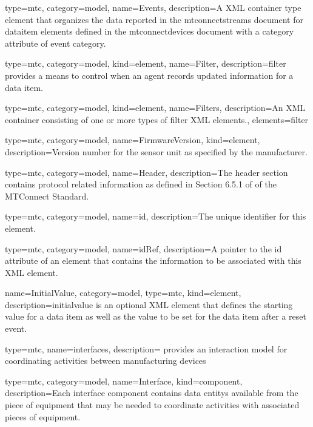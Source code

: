 {
  type=mtc,
  category=model,
  name={Events},
  description={A XML container type element that organizes the data reported in the \glspl{mtconnectstream} document for \gls{dataitem} elements defined in the \glspl{mtconnectdevice} document with a \gls{category} attribute of \gls{event category}.}
}


{
  type=mtc,
  category=model,
  kind={element},
  name={Filter},
  description={\gls{filter} provides a means to control when an \gls{agent} records updated information for a data item.}
}

{
  type=mtc,
  category=model,
  kind={element},
  name={Filters},
  description={An XML container consisting of one or more types of \gls{filter} XML elements.},
  elements={\gls{filter}}
}


{
  type=mtc,
  category=model,
  name={FirmwareVersion},
  kind={element},
  description={Version number for the sensor unit as specified by the manufacturer.}
}


{
  type=mtc,
  category=model,
  name={Header},
  description={The \gls{header} section contains protocol related information as defined in Section 6.5.1 of  of the MTConnect Standard.}
}


{
  type=mtc,
  category=model,
  name={id},
  description={The unique identifier for this element.}
}


{
  type=mtc,
  category=model,
  name={idRef},
  description={A pointer to the \gls{id} attribute of an element that contains the information to be associated with this XML element.}
}


{
  name={InitialValue},
  category=model,
  type=mtc,
  kind={element},
  description={\gls{initialvalue} is an optional XML element that defines the starting value for a data item as well as the value to be set for the data item after a reset event.}
}


{
  type=mtc,
  name=interfaces,
  description={ provides an interaction model for coordinating activities between manufacturing devices}
}


{
  type=mtc,
  category=model,
  name={Interface},
  kind={component},
  description={Each \gls{interface component} contains \glspl{data entity} available from the piece of equipment that may be needed to coordinate activities with associated pieces of equipment.}
}


